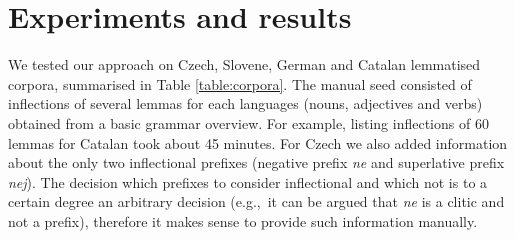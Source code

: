\documentclass[11pt]{article}
\newcommand{\e}[1]{\textit{#1}} %
\newcommand{\eg}{e.g.,~}
\begin{document}
%

\section{Experiments and results}

We tested our approach on Czech, Slovene, German and Catalan lemmatised corpora, summarised in Table \ref{table:corpora}. %
The manual seed consisted of inflections of several lemmas for each languages (nouns, adjectives and verbs) obtained from a basic grammar overview. For example, listing inflections of 60 lemmas for Catalan took about 45 minutes. For Czech we also added information about the only two inflectional prefixes (negative prefix \e{ne} and superlative prefix \e{nej}). The decision which prefixes to consider inflectional and which not is to a certain degree an arbitrary decision (\eg it can be argued that \e{ne} is a clitic and not a prefix), therefore it makes sense to provide such information manually.
\end{document}
